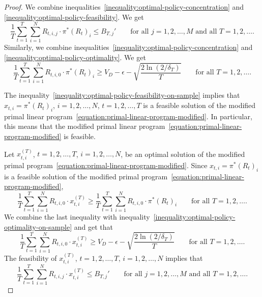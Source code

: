 \documentclass[12pt]{article}
\theoremstyle{definition}
\begin{document}
\begin{proof}
We combine inequalities~\eqref{inequality:optimal-policy-concentration}
and \eqref{inequality:optimal-policy-feasibility}. We get
\begin{equation}
\label{inequality:optimal-policy-feasibility-on-sample}
\frac{1}{T} \sum_{t=1}^T \sum_{i=1}^N R_{t,i,j} \cdot \pi^*(R_t)_i \le B_{T,j}'
\qquad \text{for all $j=1,2,\dots,M$ and all $T=1,2,\dots$.}
\end{equation}
Similarly, we combine inequalities~\eqref{inequality:optimal-policy-concentration}
and \eqref{inequality:optimal-policy-optimality}. We get
\begin{equation}
\label{inequality:optimal-policy-optimality-on-sample}
\frac{1}{T} \sum_{t=1}^T \sum_{i=1}^N R_{t,i,0} \cdot \pi^*(R_t)_i \ge V_D - \epsilon - \sqrt{ \frac{2\ln(2/\delta_T)}{T}}
\qquad \text{for all $T=1,2,\dots$.}
\end{equation}

The inequality~\eqref{inequality:optimal-policy-feasibility-on-sample} implies
that $x_{t,i} = \pi^*(R_t)_i$, $i=1,2,\dots,N$, $t=1,2,\dots,T$ is a feasible
solution of the modified primal linear
program~\eqref{equation:primal-linear-program-modified}. In particular, this
means that the modified primal linear
program~\eqref{equation:primal-linear-program-modified} is feasible.

Let $x^{(T)}_{t,i}$, $t=1,2,\dots,T$, $i=1,2,\dots,N$, be an optimal solution of
the modified primal program~\eqref{equation:primal-linear-program-modified}.
Since $x_{t,i} = \pi^*(R_t)_i$ is a feasible solution of the modified primal
program~\eqref{equation:primal-linear-program-modified},
\begin{equation}
\label{inequality:sample-optimal-policy-beats-optimality-on-sample}
\frac{1}{T} \sum_{t=1}^T \sum_{i=1}^N R_{t,i,0} \cdot x^{(T)}_{t,i}
\ge \frac{1}{T} \sum_{t=1}^T \sum_{i=1}^N R_{t,i,0} \cdot \pi^*(R_t)_i
\qquad \text{for all $T=1,2,\dots$.}
\end{equation}
We combine the last inequality with inequality~\eqref{inequality:optimal-policy-optimality-on-sample}
and get that
\begin{equation}
\label{inequality:sample-optimal-policy-is-close-optimal}
\frac{1}{T} \sum_{t=1}^T \sum_{i=1}^N R_{t,i,0} \cdot x^{(T)}_{t,i}
\ge V_D - \epsilon - \sqrt{\frac{2\ln(2/\delta_T)}{T}}
\qquad \text{for all $T=1,2,\dots$.}
\end{equation}
The feasibility of $x^{(T)}_{t,i}$, $t=1,2,\dots,T$, $i=1,2,\dots,N$ implies that
\begin{equation}
\label{inequality:sample-optimal-policy-feasibility}
\frac{1}{T} \sum_{t=1}^T \sum_{i=1}^N R_{t,i,j} \cdot x^{(T)}_{t,i} \le B_{T,j}'
\qquad \text{for all $j=1,2,\dots,M$ and all $T=1,2,\dots$.}
\end{equation}


\end{proof}
\end{document}

